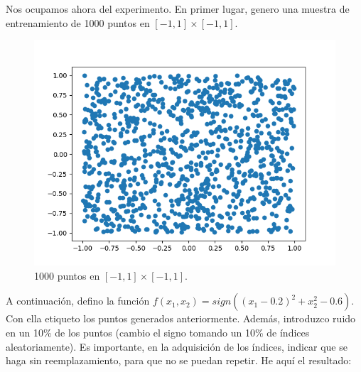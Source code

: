Nos ocupamos ahora del experimento. En primer lugar, genero una muestra de entrenamiento de 1000 puntos en $[-1,1]\times[-1,1]$.
\begin{figure}[H] %
	\centering
	\includegraphics[scale=0.8]{puntos.png}  %
	\caption{1000 puntos en $[-1,1]\times[-1,1]$.} 
	\label{fig:puntos2D}
\end{figure}

A continuación, defino la función $f(x_1,x_2) = sign((x_1-0.2)^2+x_2^2-0.6)$. Con ella etiqueto los puntos generados anteriormente. Además, introduzco ruido en un 10\% de los puntos (cambio el signo tomando un 10\% de índices aleatoriamente). Es importante, en la adquisición de los índices, indicar que se haga sin reemplazamiento, para que no se puedan repetir. He aquí el resultado:

